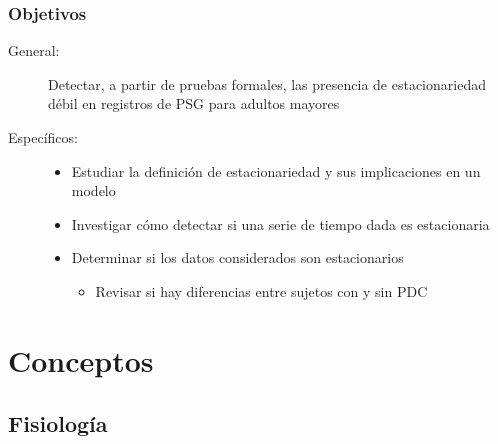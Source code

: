 \documentclass{beamer}
\begin{document}
\begin{frame}\frametitle{Objetivos}
{\small
\begin{description}
\item[General:]
Detectar, a partir de pruebas formales, las presencia de estacionariedad d\'ebil 
en registros de PSG para adultos mayores%

\item[Espec\'ificos:]
\begin{itemize}
\item Estudiar la definici\'on de estacionariedad y sus implicaciones en un modelo

\item Investigar c\'omo detectar si una serie de tiempo dada es estacionaria

\item Determinar si los datos considerados son estacionarios
\begin{itemize}
\item Revisar si hay diferencias entre sujetos con y sin PDC
\end{itemize}
\end{itemize}
\end{description}
}
\end{frame}


\section{Conceptos}


\subsection{Fisiolog\'ia}
\end{document}
